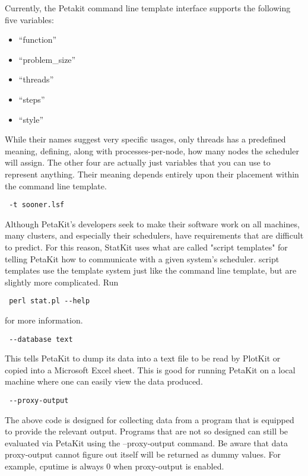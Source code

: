 \documentclass[12pt]{article}
\begin{document}
Currently, the Petakit command line template interface supports the following five variables:
\begin{itemize}
\item``function''
\item``problem\_size''
\item``threads''
\item``steps''
\item``style''
\end{itemize}

While their names suggest very specific usages, only threads has a predefined meaning, defining, along with processes-per-node, how many nodes the scheduler will assign. The other four are actually just variables that you can use to represent anything. Their meaning depends entirely upon their placement within the command line template. 

\begin{verbatim} -t sooner.lsf \end{verbatim}

Although PetaKit's developers seek to make their software work on all machines, many clusters, and especially their schedulers, have requirements that are difficult to predict. For this reason, StatKit uses what are called "script templates" for telling PetaKit how to communicate with a given system's scheduler. script templates use the template system just like the command line template, but are slightly more complicated. Run \begin{verbatim} perl stat.pl --help \end{verbatim} for more information.

\begin{verbatim} --database text \end{verbatim}
This tells PetaKit to dump its data into a text file to be read by PlotKit or copied into a Microsoft Excel sheet. This is good for running PetaKit on a local machine where one can easily view the data produced.

\begin{verbatim} --proxy-output \end{verbatim}
The above code is designed for collecting data from a program that is equipped to provide the relevant output. Programs that are not so designed can still be evaluated via PetaKit using the --proxy-output command. Be aware that data proxy-output cannot figure out itself will be returned as dummy values. For example, cputime is always 0 when proxy-output is enabled.
\end{document}

